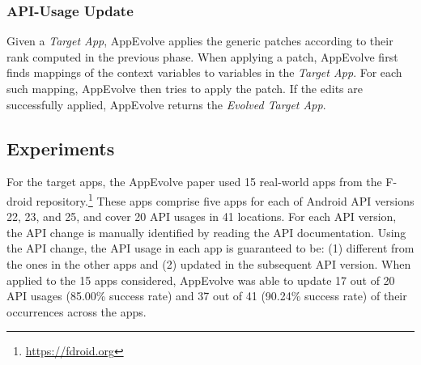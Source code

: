 \subsubsection{API-Usage Update}
Given a {\em Target App}, AppEvolve applies the generic patches according
to their rank computed in the previous phase. When applying a patch,
AppEvolve first finds mappings of the context variables to variables in the
{\em Target App}. For each such mapping, AppEvolve then tries to apply the
patch. If the edits are successfully applied, AppEvolve returns the {\em
  Evolved Target App}.

\subsection{Experiments}
For the target apps, the AppEvolve paper used 15 real-world apps from the
F-droid repository.\footnote{\url{https://fdroid.org}} These apps comprise
five apps for each of Android API versions 22, 23, and 25, and cover 20 API
usages in 41 locations. For each API version, the API change is manually
identified by reading the API documentation. Using the API change, the API
usage in each app is guaranteed to be: (1) different from the ones in the
other apps and (2) updated in the subsequent API version.  When applied to
the 15 apps considered, AppEvolve was able to update 17 out of 20 API
usages (85.00\% success rate) and 37 out of 41 (90.24\% success rate) of their occurrences across
the apps. %


